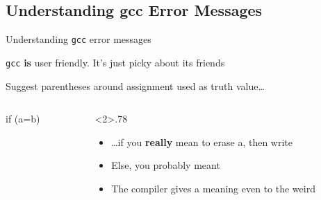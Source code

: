 \subsection{Understanding gcc Error Messages}
\begin{frame}[fragile]{Understanding \texttt{gcc} error messages}
  \centerline{\texttt{gcc} \textbf{is} user friendly. It's just picky about its
    friends}\smallskip

   \bigskip
   \bigskip

  \begin{block}{Suggest parentheses around assignment used as truth value\ldots}
    \bigskip\smallskip
    \begin{columns}
      \begin{column}{.1\linewidth}
        \begin{boitecode}{}
if (a=b)
        \end{boitecode}
      \end{column}
      \begin{column}<2>{.78\linewidth}
        \begin{itemize}\vspace{-1.3\baselineskip}
        \item \ldots if you \textbf{really} mean to erase a, 
          then write 
        \item Else, you probably meant 
        \item The compiler gives a meaning even to the weird 
        \end{itemize}
      \end{column}
    \end{columns}
  \end{block}
\end{frame}
